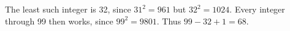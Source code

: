 The least such integer is 32, since $31^2=961$ but $32^2=1024$. Every integer through 99 then works, since $99^2=9801$. Thus $99-32+1=\boxed{68}$.
